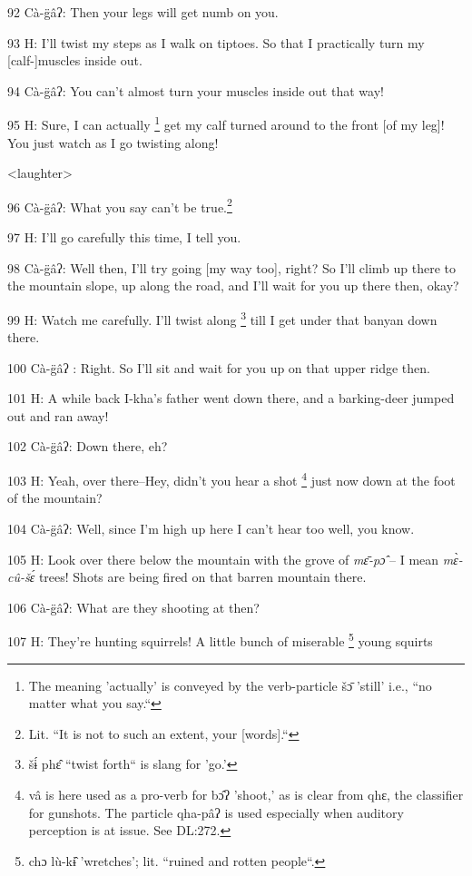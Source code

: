 \leftskip=0pt
92  Cà-g̈âʔ: Then your legs will get numb on you.

93 H: I'll twist my steps as I walk on tiptoes. So that I practically turn my [calf-]muscles
inside out.

94  Cà-g̈âʔ: You can't almost turn your muscles inside out that way!

95 H: Sure, I can actually \footnote{The meaning 'actually' is conveyed by the verb-particle šɔ̄ 'still' i.e., ``no matter what you say.``} get my calf turned around to the front [of my leg]!
You just watch as I go twisting along!

\begin{center}
<laughter>
\end{center}

\leftskip=0pt
96  Cà-g̈âʔ: What you say can't be true.\footnote{Lit. ``It is not to such an extent, your [words].``}

97 H: I'll go carefully this time, I tell you.

98  Cà-g̈âʔ: Well then, I'll try going [my way too], right? So I'll climb up
there to the mountain slope, up along the road, and I'll wait for you up there
then, okay?

99 H: Watch me carefully. I'll twist along \footnote{šɨ́ phɛ̂ ``twist forth`` is slang for 'go.'} till I get under that banyan down
there.

100 Cà-g̈âʔ : Right. So I'll sit and wait for you up on that upper ridge then.

101 H: A while back I-kha's father went down there, and a barking-deer jumped out
and ran away!

102  Cà-g̈âʔ: Down there, eh?

103 H: Yeah, over there--Hey, didn't you hear a shot \footnote{vâ is here used as a pro-verb for bɔ̂ʔ 'shoot,' as is clear from qhɛ, the classifier\textbf{ }for gunshots. The particle qha-pâʔ is used especially when auditory perception is at issue. See DL:272.} just now down at the
foot of the mountain?

104  Cà-g̈âʔ: Well, since I'm high up here I can't hear too well, you know.

105 H: Look over there below the mountain with the grove of \textit{mɛ̄-pɔ̂
}-- I mean \textit{mɛ̀-cû-šɛ́} trees! Shots are being fired on that barren
mountain there.

106  Cà-g̈âʔ: What are they shooting at then?

107 H: They're hunting squirrels! A little bunch of miserable \footnote{chɔ lù-kɨ̂ 'wretches'; lit. ``ruined and rotten people``.} young squirts
